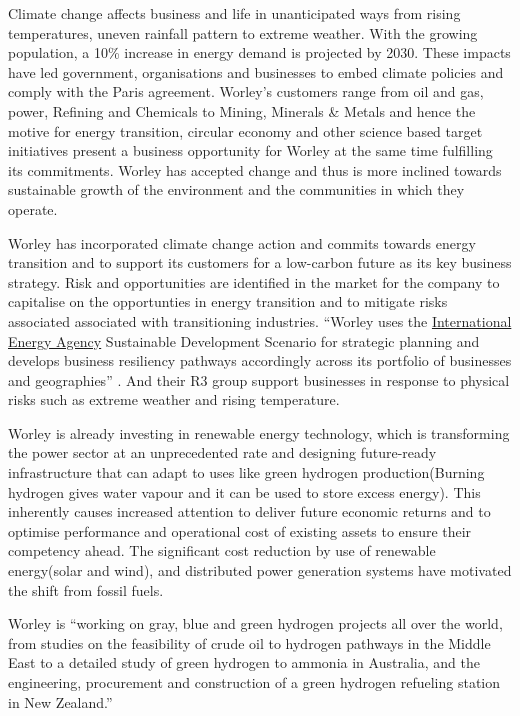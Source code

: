 \documentclass[11pt,a4paper,]{article}
\begin{document}
Climate change affects business and life in unanticipated ways from rising temperatures, uneven rainfall pattern to extreme weather. With the growing population, a 10\% increase in energy demand is projected by 2030. These impacts have led government, organisations and businesses to embed climate policies and comply with the Paris agreement. Worley's customers range from oil and gas, power, Refining and Chemicals to Mining, Minerals \& Metals and hence the motive for energy transition, circular economy and other science based target initiatives present a business opportunity for Worley at the same time fulfilling its commitments. Worley has accepted change and thus is more inclined towards sustainable growth of the environment and the communities in which they operate.

Worley has incorporated climate change action and commits towards energy transition and to support its customers for a low-carbon future as its key business strategy. Risk and opportunities are identified in the market for the company to capitalise on the opportunties in energy transition and to mitigate risks associated associated with transitioning industries. ``Worley uses the \href{https://www.iea.org/}{International Energy Agency} Sustainable Development Scenario \textcite{iea} for strategic planning and develops business resiliency pathways accordingly across its portfolio of businesses and geographies'' \textcite{sustainabilityreport2020}. And their R3 group support businesses in response to physical risks such as extreme weather and rising temperature.

Worley is already investing in renewable energy technology, which is transforming the power sector at an unprecedented rate and designing future-ready infrastructure that can adapt to uses like green hydrogen production(Burning hydrogen gives water vapour and it can be used to store excess energy). This inherently causes increased attention to deliver future economic returns and to optimise performance and operational cost of existing assets to ensure their competency ahead. The significant cost reduction by use of renewable energy(solar and wind), and distributed power generation systems have motivated the shift from fossil fuels.

Worley is ``working on gray, blue and green hydrogen projects all over the world, from studies on the feasibility of crude oil to hydrogen pathways in the Middle East to a detailed study of green hydrogen to ammonia in Australia, and the engineering, procurement and construction of a green hydrogen refueling station in New Zealand.'' \textcite{sustainabilityreport2020}
\end{document}

